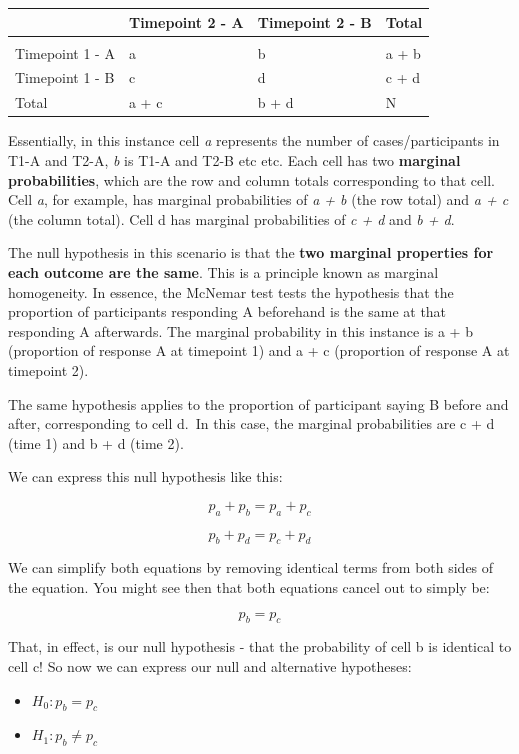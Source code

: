 \documentclass[
]{book}
\providecommand{\tightlist}{%
  \setlength{\itemsep}{0pt}\setlength{\parskip}{0pt}}
\begin{document}
\begin{tabular}{l|l|l|l}
\hline
 & Timepoint 2 - A & Timepoint 2 - B & Total\\
\hline
 &  &  & \\
\hline
Timepoint 1 - A & a & b & a + b\\
\hline
Timepoint 1 - B & c & d & c + d\\
\hline
Total & a + c & b + d & N\\
\hline
\end{tabular}

Essentially, in this instance cell \emph{a} represents the number of cases/participants in T1-A and T2-A, \emph{b} is T1-A and T2-B etc etc. Each cell has two \textbf{marginal probabilities}, which are the row and column totals corresponding to that cell. Cell \emph{a}, for example, has marginal probabilities of \emph{a + b} (the row total) and \emph{a + c} (the column total). Cell d has marginal probabilities of \emph{c + d} and \emph{b + d}.

The null hypothesis in this scenario is that the \textbf{two marginal properties for each outcome are the same}. This is a principle known as marginal homogeneity. In essence, the McNemar test tests the hypothesis that the proportion of participants responding A beforehand is the same at that responding A afterwards. The marginal probability in this instance is a + b (proportion of response A at timepoint 1) and a + c (proportion of response A at timepoint 2).

The same hypothesis applies to the proportion of participant saying B before and after, corresponding to cell d.~In this case, the marginal probabilities are c + d (time 1) and b + d (time 2).

We can express this null hypothesis like this:

\[
p_a + p_b = p_a + p_c
\]

\[
p_b + p_d = p_c + p_d
\]

We can simplify both equations by removing identical terms from both sides of the equation. You might see then that both equations cancel out to simply be:

\[
p_b = p_c
\]

That, in effect, is our null hypothesis - that the probability of cell b is identical to cell c! So now we can express our null and alternative hypotheses:

\begin{itemize}
\tightlist
\item
  \(H_0: p_b = p_c\)
\item
  \(H_1: p_b \neq p_c\)
\end{itemize}
\end{document}
